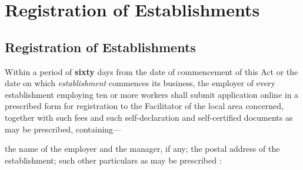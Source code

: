 \documentclass[gaz8,ordinance]{mhact}
\begin{document}
        \chapter{Registration of Establishments} 
        
        \section{Registration of Establishments} 
        
      \begin{subsectionlist}
    
     Within a period of 
   \textbf{sixty}
   days from the date of commencement of this Act or the date on which 
   \emph{establishment}
   commences its business, the employer of every establishment employing ten or more workers shall submit application online in a prescribed form for registration to the Facilitator of the local area concerned, together with such fees and such self-declaration and self-certified documents as may be prescribed, containing---

      \begin{clause}
    
     the name of the employer and the manager, if any;
     the postal address of the establishment;
     such other particulars as may be prescribed :
       \end{clause}
    
       \end{subsectionlist}
    
\end{document}
